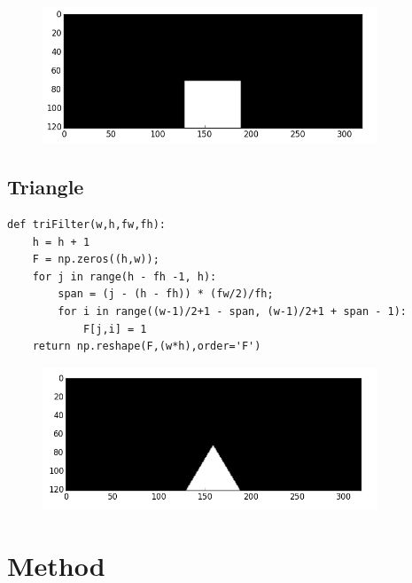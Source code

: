 \documentclass[12pt, letterpaper]{article}
\begin{document}
\begin{center}
	\begin{figure}[!htbp]
		\centering
		\includegraphics[width=10cm, keepaspectratio]{filters/rect}
		\label{fig:rect}
	\end{figure}
\end{center}

\subsection{Triangle}

\begin{verbatim}
def triFilter(w,h,fw,fh):
    h = h + 1
    F = np.zeros((h,w));
    for j in range(h - fh -1, h):
        span = (j - (h - fh)) * (fw/2)/fh;
        for i in range((w-1)/2+1 - span, (w-1)/2+1 + span - 1):
            F[j,i] = 1
    return np.reshape(F,(w*h),order='F')
\end{verbatim}

\begin{center}
	\begin{figure}[!htbp]
		\centering
		\includegraphics[width=10cm, keepaspectratio]{filters/tri}
		\label{fig:tri}
	\end{figure}
\end{center}


\section{Method}
\end{document}
